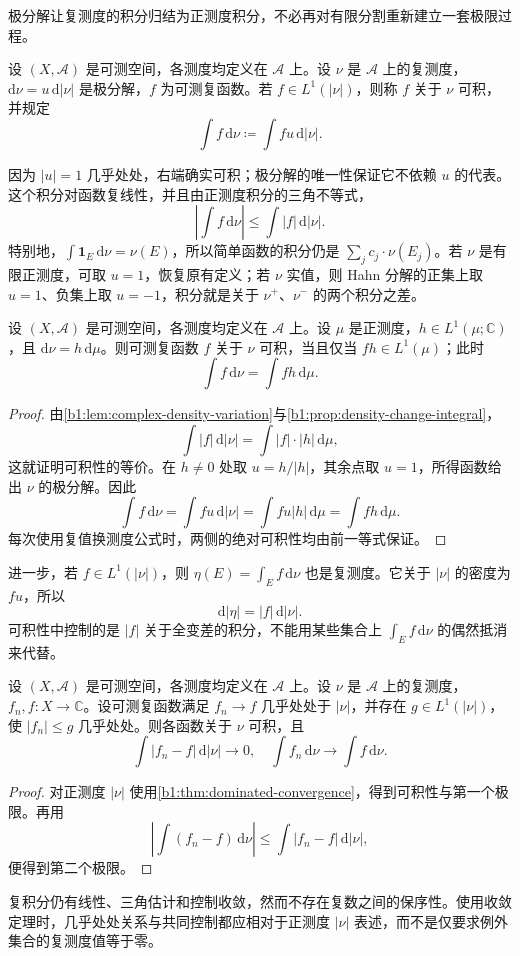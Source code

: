极分解让复测度的积分归结为正测度积分，不必再对有限分割重新建立一套极限过程。

\begin{definition}\label{b1:def:complex-measure-integral}
设 \((X,\mathcal A)\) 是可测空间，各测度均定义在 \(\mathcal A\) 上。设 \(\nu\) 是 \(\mathcal A\) 上的复测度，\(\mathrm d\nu=u\,\mathrm d|\nu|\) 是极分解，\(f\) 为可测复函数。若 \(f\in L^1(|\nu|)\)，则称 \(f\) 关于 \(\nu\) 可积，并规定
\[
\int f\,\mathrm d\nu\coloneqq\int fu\,\mathrm d|\nu|.
\]
\end{definition}

因为 \(|u|=1\) 几乎处处，右端确实可积；极分解的唯一性保证它不依赖 \(u\) 的代表。这个积分对函数复线性，并且由正测度积分的三角不等式，
\[
\left|\int f\,\mathrm d\nu\right|\leq\int|f|\,\mathrm d|\nu|.
\]
特别地，\(\int\mathbf1_E\,\mathrm d\nu=\nu(E)\)，所以简单函数的积分仍是 \(\sum_jc_j\cdot\nu(E_j)\)。若 \(\nu\) 是有限正测度，可取 \(u=1\)，恢复原有定义；若 \(\nu\) 实值，则 Hahn 分解的正集上取 \(u=1\)、负集上取 \(u=-1\)，积分就是关于 \(\nu^+\)、\(\nu^-\) 的两个积分之差。

\begin{proposition}\label{b1:prop:complex-integral-change-density}
设 \((X,\mathcal A)\) 是可测空间，各测度均定义在 \(\mathcal A\) 上。设 \(\mu\) 是正测度，\(h\in L^1(\mu;\mathbb C)\)，且 \(\mathrm d\nu=h\,\mathrm d\mu\)。则可测复函数 \(f\) 关于 \(\nu\) 可积，当且仅当 \(fh\in L^1(\mu)\)；此时
\[
\int f\,\mathrm d\nu=\int fh\,\mathrm d\mu.
\]
\end{proposition}
\begin{proof}
由\cref{b1:lem:complex-density-variation}与\cref{b1:prop:density-change-integral}，
\[
\int|f|\,\mathrm d|\nu|=\int|f|\cdot|h|\,\mathrm d\mu,
\]
这就证明可积性的等价。在 \(h\neq0\) 处取 \(u=h/|h|\)，其余点取 \(u=1\)，所得函数给出 \(\nu\) 的极分解。因此
\[
\int f\,\mathrm d\nu
=\int fu\,\mathrm d|\nu|
=\int fu|h|\,\mathrm d\mu
=\int fh\,\mathrm d\mu.
\]
每次使用复值换测度公式时，两侧的绝对可积性均由前一等式保证。
\end{proof}

进一步，若 \(f\in L^1(|\nu|)\)，则 \(\eta(E)=\int_Ef\,\mathrm d\nu\) 也是复测度。它关于 \(|\nu|\) 的密度为 \(fu\)，所以
\[
\mathrm d|\eta|=|f|\,\mathrm d|\nu|.
\]
可积性中控制的是 \(|f|\) 关于全变差的积分，不能用某些集合上 \(\int_Ef\,\mathrm d\nu\) 的偶然抵消来代替。

\begin{corollary}[复测度的控制收敛]\label{b1:cor:complex-measure-dominated-convergence}
设 \((X,\mathcal A)\) 是可测空间，各测度均定义在 \(\mathcal A\) 上。设 \(\nu\) 是 \(\mathcal A\) 上的复测度，\(f_n,f:X\to\mathbb C\)。设可测复函数满足 \(f_n\to f\) 几乎处处于 \(|\nu|\)，并存在 \(g\in L^1(|\nu|)\)，使 \(|f_n|\leq g\) 几乎处处。则各函数关于 \(\nu\) 可积，且
\[
\int|f_n-f|\,\mathrm d|\nu|\longrightarrow0,\quad
\int f_n\,\mathrm d\nu\longrightarrow\int f\,\mathrm d\nu.
\]
\end{corollary}
\begin{proof}
对正测度 \(|\nu|\) 使用\cref{b1:thm:dominated-convergence}，得到可积性与第一个极限。再用
\[
\left|\int(f_n-f)\,\mathrm d\nu\right|
\leq\int|f_n-f|\,\mathrm d|\nu|,
\]
便得到第二个极限。
\end{proof}

复积分仍有线性、三角估计和控制收敛，然而不存在复数之间的保序性。使用收敛定理时，几乎处处关系与共同控制都应相对于正测度 \(|\nu|\) 表述，而不是仅要求例外集合的复测度值等于零。
